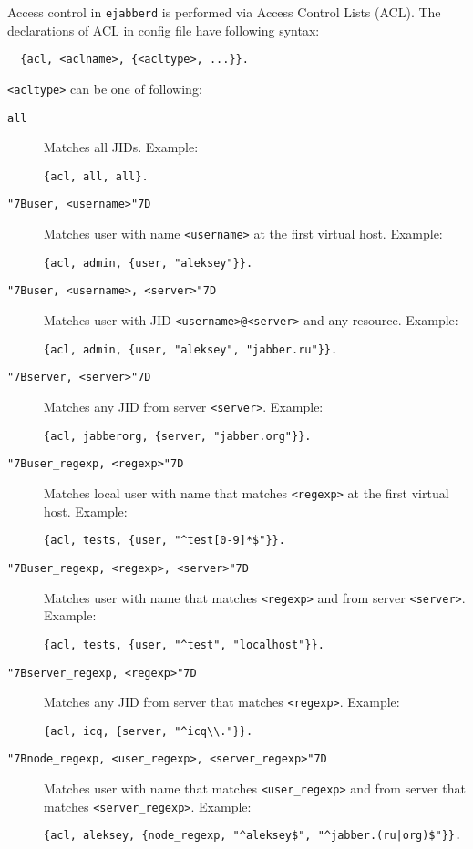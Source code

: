 \documentclass[a4paper,10pt]{article}
\newcommand{\bracehack}{\def\{{\char"7B}\def\}{\char"7D}}
\newcommand{\term}[1]{\texttt{#1}}
\newcommand{\ejabberd}{\texttt{ejabberd}}
\newcommand{\titem}[1]{\item[\bracehack\texttt{#1}]}
\begin{document}
Access control in \ejabberd{} is performed via Access Control Lists (ACL).  The
declarations of ACL in config file have following syntax:
\begin{verbatim}
  {acl, <aclname>, {<acltype>, ...}}.
\end{verbatim}

\term{<acltype>} can be one of following:
\begin{description}
\titem{all} Matches all JIDs.  Example:
\begin{verbatim}
{acl, all, all}.
\end{verbatim}
\titem{\{user, <username>\}} Matches user with name
  \term{<username>} at the first virtual host.  Example:
\begin{verbatim}
{acl, admin, {user, "aleksey"}}.
\end{verbatim}
\titem{\{user, <username>, <server>\}} Matches user with JID
  \term{<username>@<server>} and any resource.  Example:
\begin{verbatim}
{acl, admin, {user, "aleksey", "jabber.ru"}}.
\end{verbatim}
\titem{\{server, <server>\}} Matches any JID from server
  \term{<server>}.  Example:
\begin{verbatim}
{acl, jabberorg, {server, "jabber.org"}}.
\end{verbatim}
\titem{\{user\_regexp, <regexp>\}} Matches local user with name that
  matches \term{<regexp>} at the first virtual host.  Example:
\begin{verbatim}
{acl, tests, {user, "^test[0-9]*$"}}.
\end{verbatim}
\titem{\{user\_regexp, <regexp>, <server>\}} Matches user with name
  that matches \term{<regexp>} and from server \term{<server>}.  Example:
\begin{verbatim}
{acl, tests, {user, "^test", "localhost"}}.
\end{verbatim}
\titem{\{server\_regexp, <regexp>\}} Matches any JID from server that
  matches \term{<regexp>}.  Example:
\begin{verbatim}
{acl, icq, {server, "^icq\\."}}.
\end{verbatim}
\titem{\{node\_regexp, <user\_regexp>, <server\_regexp>\}} Matches user
  with name that matches \term{<user\_regexp>} and from server that matches
  \term{<server\_regexp>}.  Example:
\begin{verbatim}
{acl, aleksey, {node_regexp, "^aleksey$", "^jabber.(ru|org)$"}}.
\end{verbatim}

\end{description}
\end{document}
